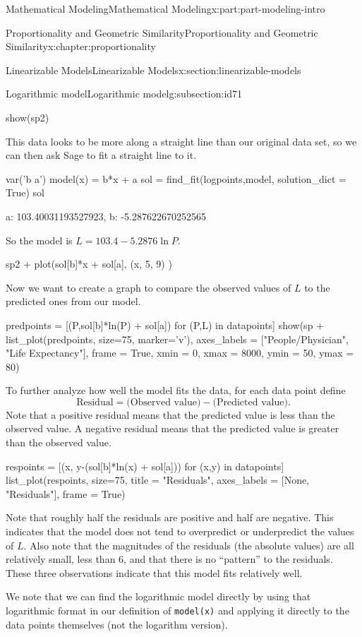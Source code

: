 \documentclass[oneside,10pt,]{book}
\newcommand{\mono}[1]{\texttt{#1}}
\numberwithin{equation}{section}
\begin{document}
\begin{partptx}{Mathematical Modeling}{}{Mathematical Modeling}{}{}{x:part:part-modeling-intro}
\begin{chapterptx}{Proportionality and Geometric Similarity}{}{Proportionality and Geometric Similarity}{}{}{x:chapter:proportionality}
\begin{sectionptx}{Linearizable Models}{}{Linearizable Models}{}{}{x:section:linearizable-models}
\begin{subsectionptx}{Logarithmic model}{}{Logarithmic model}{}{}{g:subsection:id71}
\begin{sageinput}
show(sp2)
\end{sageinput}
This data looks to be more along a straight line than our original data set, so we can then ask Sage to fit a straight line to it.%
\begin{sageinput}
var('b a')
model(x) = b*x + a
sol = find_fit(logpoints,model, solution_dict = True)
sol
\end{sageinput}
\begin{sageoutput}
{a: 103.40031193527923, b: -5.287622670252565}
\end{sageoutput}
So the model is \(L = 103.4 - 5.2876\ln P\).%
\begin{sageinput}
sp2 + plot(sol[b]*x + sol[a], (x, 5, 9) )
\end{sageinput}
Now we want to create a graph to compare the observed values of \(L\) to the predicted ones from our model.%
\begin{sageinput}
predpoints = [(P,sol[b]*ln(P) + sol[a]) for (P,L) in datapoints]
show(sp + list_plot(predpoints, size=75, marker='v'), 
     axes_labels = ["People/Physician", "Life Expectancy"], 
     frame = True, xmin = 0, xmax = 8000, ymin = 50, ymax = 80)
\end{sageinput}
To further analyze how well the model fits the data, for each data point define%
%
\begin{equation*}
\text{Residual} = \text{(Observed value)} - \text{(Predicted value)}.
\end{equation*}
Note that a positive residual means that the predicted value is less than the observed value.  A negative residual means that the predicted value is greater than the observed value.%
\begin{sageinput}
respoints = [(x, y-(sol[b]*ln(x) + sol[a])) 
	for (x,y) in datapoints]
list_plot(respoints, size=75, title = "Residuals", 
	axes_labels = [None, "Residuals"], frame = True)
\end{sageinput}
Note that roughly half the residuals are positive and half are negative.  This indicates that the model does not tend to overpredict or underpredict the values of \(L\).  Also note that the magnitudes of the residuals (the absolute values) are all relatively small, less than 6, and that there is no ``pattern'' to the residuals.  These three observations indicate that this model fits relatively well.%
\par
We note that we can find the logarithmic model directly by using that logarithmic format in our definition of \mono{model(x)} and applying it directly to the data points themselves (not the logarithm version).%

\end{subsectionptx}
\end{sectionptx}
\end{chapterptx}
\end{partptx}
\end{document}
